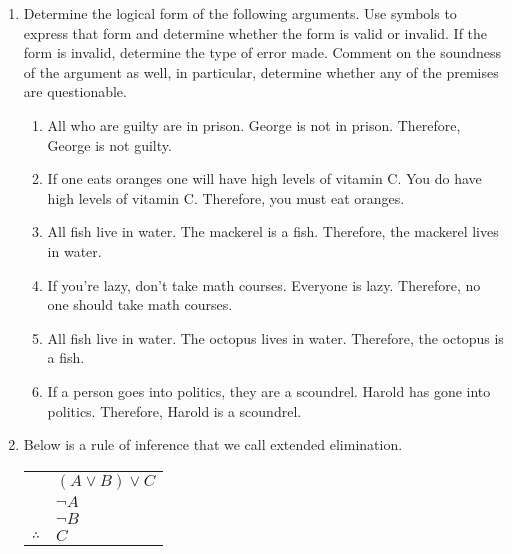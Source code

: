 \begin{enumerate}
\item Determine the logical form of the following arguments.  Use symbols
to express that form and determine whether the form is valid or invalid.
If the form is invalid, determine the type of error made.  Comment on the 
soundness of the argument as well, in particular, determine whether any of
the premises are questionable.
\begin{enumerate}
\item All who are guilty are in prison. \newline
  George is not in prison.  \newline
  Therefore, George is not guilty.
\item If one eats oranges one will have high levels of vitamin C. \newline
  You do have high levels of vitamin C. \newline
  Therefore, you must eat oranges.
\item All fish live in water. \newline
  The mackerel is a fish. \newline
  Therefore, the mackerel lives in water. 
\item If you're lazy, don't take math courses.\newline
  Everyone is lazy. \newline
  Therefore, no one should take math courses.
\item All fish live in water. \newline
  The octopus lives in water. \newline
  Therefore, the octopus is a fish.
\item If a person goes into politics, they are a scoundrel.\newline
  Harold has gone into politics. \newline
  Therefore, Harold is a scoundrel. 
\end{enumerate}

\item Below is a rule of inference that we call extended elimination.

\begin{tabular}{cl}
 & $(A \lor B) \lor C$ \\
 & $\lnot A$ \\
 & $\lnot B$ \\ \hline
$\therefore$ & $C$ \\
\end{tabular}


\end{enumerate}
